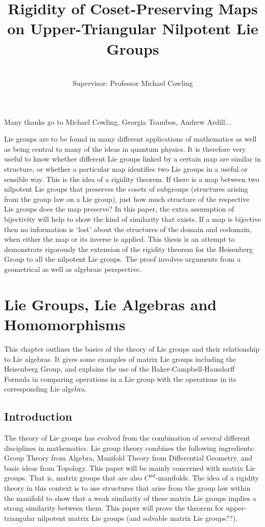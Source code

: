 \documentclass[honours]{UNSWthesis}
\title{Rigidity of Coset-Preserving Maps on Upper-Triangular Nilpotent Lie Groups}
\author{\Authornameonly\\{\bigskip}Supervisor: Professor Michael Cowling}
\newcommand{\1}{\mathbf{e}_{1}}
\newcommand{\2}{\mathbf{e}_{3}}
\newcommand{\3}{\mathbf{e}_{3}}
\begin{document}
\maketitle

{\noindent}Many thanks go to Michael Cowling, Georgia Tsambos, Andrew Ardill...


Lie groups are to be found in many different applications of mathematics as well as being central to many of the ideas in quantum physics. It is therefore very useful to know whether different Lie groups linked by a certain map are similar in structure, or whether a particular map identifies two Lie groups in a useful or sensible way. This is the idea of a rigidity theorem. If there is a map between two nilpotent Lie groups that preserves the cosets of subgroups (structures arising from the group law on a Lie group), just how much structure of the respective Lie groups does the map preserve? In this paper, the extra assumption of bijectivity will help to show the kind of similarity that exists. If a map is bijective then no information is `lost' about the structures of the domain and codomain, when either the map or its inverse is applied. 
This thesis is an attempt to demonstrate rigorously the extension of the rigidity theorem for the Heisenberg Group to all the nilpotent Lie groups. The proof involves arguments from a geometrical as well as algebraic perspective. 


\chapter{Lie Groups, Lie Algebras and Homomorphisms}
This chapter outlines the basics of the theory of Lie groups and their relationship to Lie algebras. It gives some examples of matrix Lie groups including the Heisenberg Group, and explains the use of the Baker-Campbell-Hausdorff Formula in comparing operations in a Lie group with the operations in its corresponding Lie algebra. 

\section{Introduction}
The theory of Lie groups has evolved from the combination of several different disciplines in mathematics. Lie group theory combines the following ingredients: Group Theory from Algebra, Manifold Theory from Differential Geometry, and basic ideas from Topology. This paper will be mainly concerned with matrix Lie groups. That is, matrix groups that are also $C^{\inf}$-manifolds. The idea of a rigidity theory in this context is to use structures that arise from the group law within the manifold to show that a weak similarity of these matrix Lie groups implies a strong similarity between them. This paper will prove the theorem for upper-triangular nilpotent matrix Lie groups (and solvable matrix Lie groups??).
\end{document}

